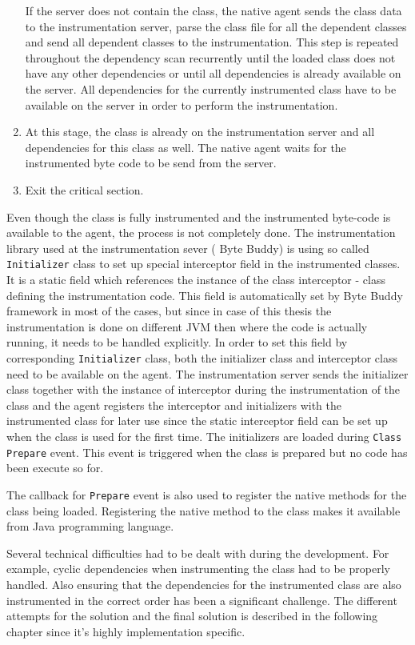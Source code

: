 \begin{enumerate}
	If the server does not contain the class, the native agent sends the class data to the instrumentation server, parse the class file for all the dependent classes and send all dependent classes to the instrumentation. This step is repeated throughout the dependency scan recurrently until the loaded class does not have any other dependencies or until all dependencies is already available on the server. All dependencies for the currently instrumented class have to be available on the server in order to perform the instrumentation.

	\item At this stage, the class is already on the instrumentation server and all dependencies for this class as well. The native agent waits for the instrumented byte code to be send from the server. 
	\item Exit the critical section.
\end{enumerate}	
Even though the class is fully instrumented and the instrumented byte-code is available to the agent, the process is not completely done. The instrumentation library used at the instrumentation sever ( Byte Buddy) is using so called \texttt{Initializer} class to set up special interceptor field in the instrumented classes. It is a static field which references the instance of the class interceptor - class defining the instrumentation code. This field is automatically set by Byte Buddy framework in most of the cases, but since in case of this thesis the instrumentation is done on different JVM then where the code is actually running, it needs to be handled explicitly. In order to set this field by corresponding \texttt{Initializer} class, both the initializer class and interceptor class need to be available on the agent. The instrumentation server sends the initializer class together with the instance of interceptor during the instrumentation of the class and the agent registers the interceptor and initializers with the instrumented class for later use since the static interceptor field can be set up when the class is used for the first time. The initializers are loaded during  \texttt{Class Prepare} event. This event is triggered when the class is prepared but no code has been execute so for. 

The callback for \texttt{Prepare} event is also used to register the native methods for the class being loaded. Registering the native method to the class makes it available from Java programming language.

Several technical difficulties had to be dealt with during the development. For example,  cyclic dependencies when instrumenting the class had to be properly handled. Also ensuring that the dependencies for the instrumented class are also instrumented in the correct order has been a significant challenge. The different attempts for the solution and the final solution is described in the following chapter since it's highly implementation specific.
